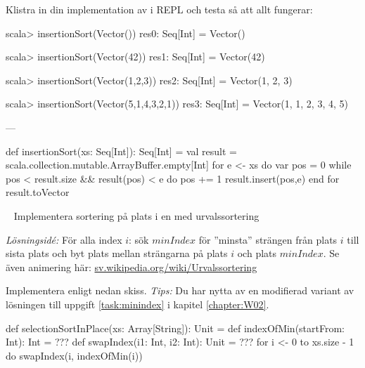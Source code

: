 Klistra in din implementation av  i REPL och testa så att allt fungerar:
\begin{REPL}
scala> insertionSort(Vector())
res0: Seq[Int] = Vector()

scala> insertionSort(Vector(42))
res1: Seq[Int] = Vector(42)

scala> insertionSort(Vector(1,2,3))
res2: Seq[Int] = Vector(1, 2, 3)

scala> insertionSort(Vector(5,1,4,3,2,1))
res3: Seq[Int] = Vector(1, 1, 2, 3, 4, 5)
\end{REPL}


\SOLUTION

\TaskSolved \what


\SubtaskSolved ---

\SubtaskSolved

\begin{Code}
def insertionSort(xs: Seq[Int]): Seq[Int] = 
  val result = scala.collection.mutable.ArrayBuffer.empty[Int]
  for e <- xs do
    var pos = 0
    while pos < result.size && result(pos) < e do pos += 1
    result.insert(pos,e)
  end for
  result.toVector
\end{Code}

\QUESTEND






\QUESTBEGIN

\Task  \what~ Implementera sortering på plats  i en  med urvalssortering 

\emph{Lösningsidé:} För alla index $i$: sök $minIndex$ för ''minsta'' strängen från plats $i$ till sista plats och byt plats mellan strängarna på plats $i$ och plats $minIndex$. Se även animering här: \href{https://sv.wikipedia.org/wiki/Urvalssortering}{sv.wikipedia.org/wiki/Urvalssortering}

Implementera enligt nedan skiss.  \emph{Tips:} Du har nytta av en modifierad variant av lösningen till uppgift \ref{task:minindex} i kapitel \ref{chapter:W02}.
\begin{Code}
def selectionSortInPlace(xs: Array[String]): Unit = 
  def indexOfMin(startFrom: Int): Int = ???
  def swapIndex(i1: Int, i2: Int): Unit = ???
  for i <- 0 to xs.size - 1 do swapIndex(i, indexOfMin(i))
\end{Code}




\SOLUTION


